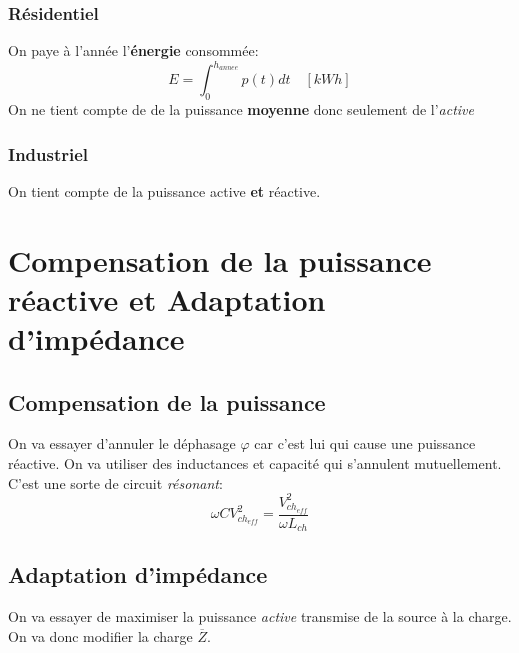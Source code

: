 \documentclass{report}
\begin{document}
\subsubsection{Résidentiel}
On paye à l'année l'\textbf{énergie} consommée:
\begin{equation}
E = \int_0^{h_{annee}} p(t) dt \quad [kWh]
\end{equation}
On ne tient compte de de la puissance \textbf{moyenne} donc seulement de l'\textit{active}

\subsubsection{Industriel}
On tient compte de la puissance active \textbf{et} réactive.

\section{Compensation de la puissance réactive et Adaptation d'impédance}
\subsection{Compensation de la puissance}
On va essayer d'annuler le déphasage $\varphi$ car c'est lui qui cause une puissance réactive. On va utiliser des inductances et capacité qui s'annulent mutuellement. C'est une sorte de circuit \textit{résonant}:
\begin{equation}
\omega C V_{ch_{eff}}^2 = \frac{V_{ch_{eff}}^2}{\omega L_{ch}}
\end{equation}

\subsection{Adaptation d'impédance}
On va essayer de maximiser la puissance \textit{active} transmise de la source à la charge. On va donc modifier la charge $\overline{Z}$.
\end{document}

